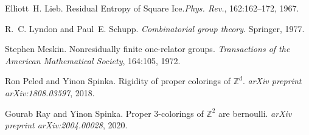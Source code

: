 \documentclass[cupthm,crop,info]{CUP-JNL-ETS}%
\theoremstyle{cupplain}
\theoremstyle{cupdefinition}
\theoremstyle{cupremark}
\theoremstyle{cupproof}
\numberwithin{equation}{section}
\begin{document}
\begin{Backmatter}
\begin{thebibliography}{10}
	Elliott~H. Lieb. {Residual Entropy of Square Ice}.{\em Phys. Rev.}, 162:162--172, 1967.

	

	R.~C. Lyndon and Paul~E. Schupp. {\em Combinatorial group theory}. Springer, 1977.

	

	Stephen Meskin. Nonresidually finite one-relator groups. {\em Transactions of the American Mathematical Society}, 164:105, 1972.

	

	Ron Peled and Yinon Spinka. Rigidity of proper colorings of {$\mathbb{Z}^{d}$}. {\em arXiv preprint arXiv:1808.03597}, 2018.

	

	Gourab Ray and Yinon Spinka. Proper 3-colorings of {$\mathbb{Z}^{2}$} are bernoulli. {\em arXiv preprint arXiv:2004.00028}, 2020.

	
\end{thebibliography}

\end{Backmatter}
\end{document}
